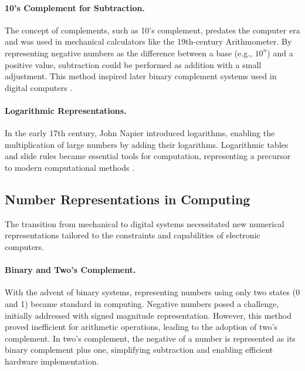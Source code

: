 \paragraph{10's Complement for Subtraction.}
The concept of complements, such as 10's complement, predates the computer era and was used in mechanical calculators like the 19th-century Arithmometer. By representing negative numbers as the difference between a base (e.g., \( 10^n \)) and a positive value, subtraction could be performed as addition with a small adjustment. This method inspired later binary complement systems used in digital computers \cite{randell1982origins}.

\paragraph{Logarithmic Representations.}
In the early 17th century, John Napier introduced logarithms, enabling the multiplication of large numbers by adding their logarithms. Logarithmic tables and slide rules became essential tools for computation, representing a precursor to modern computational methods \cite{stewart2008-taming}.

\subsection{Number Representations in Computing}

The transition from mechanical to digital systems necessitated new numerical representations tailored to the constraints and capabilities of electronic computers.

\paragraph{Binary and Two's Complement.}
With the advent of binary systems, representing numbers using only two states (0 and 1) became standard in computing. Negative numbers posed a challenge, initially addressed with signed magnitude representation. However, this method proved inefficient for arithmetic operations, leading to the adoption of two's complement. In two's complement, the negative of a number is represented as its binary complement plus one, simplifying subtraction and enabling efficient hardware implementation.

